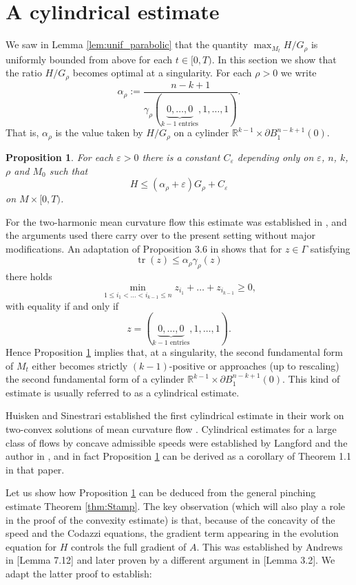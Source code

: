 \documentclass[12pt]{amsart}
\newtheorem{proposition}[theorem]{Proposition}
\DeclareMathOperator{\tr}{tr}
\begin{document}
\section{A cylindrical estimate}
\label{sec:cyl_est}

We saw in Lemma \ref{lem:unif_parabolic} that the quantity $\max_{M_t}  H/ G_\rho$ is uniformly bounded from above for each $t \in [0,T)$. In this section we show that the ratio $H/G_\rho$ becomes optimal at a singularity. For each $\rho >0$ we write
\[ \alpha_{\rho} := \frac{n-k+1}{\gamma_\rho(\underbrace{0,\dots,0}_{k-1 \text{ entries}}, 1, \dots, 1)}.\]
That is, $\alpha_{\rho}$ is the value taken by $H/G_\rho$ on a cylinder $\mathbb{R}^{k-1} \times \partial B_1^{n-k+1}(0)$.

\begin{proposition}
\label{prop:cyl_est}
For each $\varepsilon >0$ there is a constant $C_\varepsilon$ depending only on $\varepsilon$, $n$, $k$, $\rho$ and $M_0$ such that 
\[H \leq (\alpha_{\rho} + \varepsilon)G_\rho + C_\varepsilon\]
on $M\times  [0,T)$. 
\end{proposition}

For the two-harmonic mean curvature flow this estimate was established in \cite{Bren-Huisk17}, and the arguments used there carry over to the present setting without major modifications. An adaptation of Proposition 3.6 in \cite{Bren-Huisk17} shows that for $z \in \Gamma$ satisfying
\[\tr(z) \leq \alpha_{\rho} \gamma_\rho(z)\]
there holds
\[\min_{1 \leq i_1 < \dots < i_{k-1} \leq n} z_{i_1} + \dots + z_{i_{k-1}} \geq 0,\]
with equality if and only if 
\[z = (\underbrace{0,\dots,0}_{k-1 \text{ entries}}, 1, \dots, 1).\]
Hence Proposition \ref{prop:cyl_est} implies that, at a singularity, the second fundamental form of $M_t$ either becomes strictly $(k-1)$-positive or approaches (up to rescaling) the second fundamental form of a cylinder $\mathbb{R}^{k-1} \times \partial B_1^{n-k+1}(0)$. This kind of estimate is usually referred to as a cylindrical estimate. 

Huisken and Sinestrari established the first cylindrical estimate in their work on two-convex solutions of mean curvature flow \cite{Huisk-Sin09}. Cylindrical estimates for a large class of flows by concave admissible speeds were established by Langford and the author in \cite{Lang-Lyn19}, and in fact Proposition \ref{prop:cyl_est} can be derived as a corollary of Theorem 1.1 in that paper. 

Let us show how Proposition \ref{prop:cyl_est} can be deduced from the general pinching estimate Theorem \ref{thm:Stamp}. The key observation (which will also play a role in the proof of the convexity estimate) is that, because of the concavity of the speed and the Codazzi equations, the gradient term appearing in the evolution equation for $H$ controls the full gradient of $A$. This was established by Andrews in \cite{And94_euclid}[Lemma 7.12] and later proven by a different argument in \cite{Bren-Huisk17}[Lemma 3.2]. We adapt the latter proof to establish:
\end{document}
